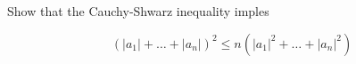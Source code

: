 Show that the Cauchy-Shwarz inequality imples

$$(|a_1|+\ldots+|a_n|)^2\leq n(|a_1|^2+\ldots+|a_n|^2)$$
